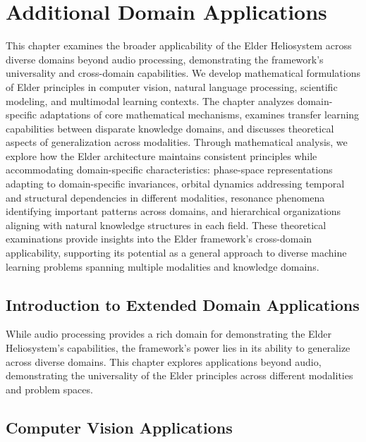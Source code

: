 \chapter{Additional Domain Applications}

\begin{tcolorbox}[colback=blue!5!white,colframe=blue!75!black,title=Chapter Summary]
This chapter examines the broader applicability of the Elder Heliosystem across diverse domains beyond audio processing, demonstrating the framework's universality and cross-domain capabilities. We develop mathematical formulations of Elder principles in computer vision, natural language processing, scientific modeling, and multimodal learning contexts. The chapter analyzes domain-specific adaptations of core mathematical mechanisms, examines transfer learning capabilities between disparate knowledge domains, and discusses theoretical aspects of generalization across modalities. Through mathematical analysis, we explore how the Elder architecture maintains consistent principles while accommodating domain-specific characteristics: phase-space representations adapting to domain-specific invariances, orbital dynamics addressing temporal and structural dependencies in different modalities, resonance phenomena identifying important patterns across domains, and hierarchical organizations aligning with natural knowledge structures in each field. These theoretical examinations provide insights into the Elder framework's cross-domain applicability, supporting its potential as a general approach to diverse machine learning problems spanning multiple modalities and knowledge domains.
\end{tcolorbox}

\section{Introduction to Extended Domain Applications}

While audio processing provides a rich domain for demonstrating the Elder Heliosystem's capabilities, the framework's power lies in its ability to generalize across diverse domains. This chapter explores applications beyond audio, demonstrating the universality of the Elder principles across different modalities and problem spaces.

\section{Computer Vision Applications}

